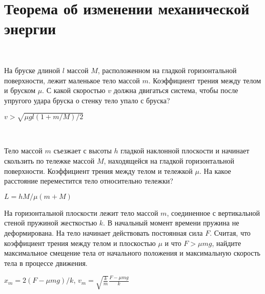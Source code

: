 \section{Теорема об изменении механической энергии}

\begin{ex}
\hspace{0pt} \\
\begin{minipage}{.65\textwidth}
На бруске длиной $l$ массой $M$, расположенном на гладкой горизонтальной поверхности, лежит маленькое тело массой $m$. Коэффициент трения между телом и бруском $\mu$. С какой скоростью $v$ должна двигаться система, чтобы после упругого удара бруска о стенку тело упало с бруска?
\end{minipage}
\begin{minipage}{.35\textwidth}
\centering

\end{minipage}
\begin{ans}
$v > \sqrt{\mu g l(1+m/M)/2}$
\end{ans}
\end{ex}

\begin{ex}
\hspace{0pt} \\
\begin{minipage}{.65\textwidth}
Тело массой $m$ съезжает с высоты $h$ гладкой наклонной плоскости и начинает скользить по тележке массой $M$, находящейся на гладкой горизонтальной поверхности. Коэффициент трения между телом и тележкой $\mu$. На какое расстояние переместится тело относительно тележки?
\end{minipage}
\begin{minipage}{.35\textwidth}
\centering

\end{minipage}
\begin{ans}
$L = hM/\mu(m+M)$
\end{ans}
\end{ex}

\begin{ex}
На горизонтальной плоскости лежит тело массой $m$, соединенное с вертикальной стеной пружиной жесткостью $k$. В начальный момент времени пружина не деформирована. На тело начинает действовать постоянная сила $F$. Считая, что коэффициент трения между телом и плоскостью $\mu$ и что $F >\mu mg$, найдите максимальное смещение тела от начального положения и максимальную скорость тела в процессе движения.
\begin{center}

\end{center}
\begin{ans}
$x_m = 2(F-\mu mg)/k$, $v_m = \sqrt{\frac{k}{m}}\frac{F-\mu mg}{k}$
\end{ans}
\end{ex}

